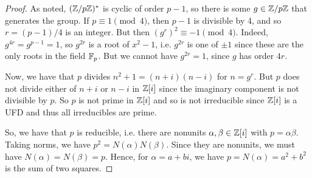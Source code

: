\begin{proof}
    As noted, $(\mathbb{Z}/p\mathbb{Z})^\ast$ is cyclic of order $p-1$, so there is some $g \in \mathbb{Z}/p\mathbb{Z}$ that generates the group. If $p \equiv 1 \pmod{4}$, then $p-1$ is divisible by 4, and so $r = (p-1)/4$ is an integer. But then $(g^r)^2 \equiv -1 \pmod{4}$. Indeed, $g^{4r} = g^{p-1} = 1$, so $g^{2r}$ is a root of $x^2-1$, i.e. $g^{2r}$ is one of $\pm 1$ since these are the only roots in the field $\mathbb{F}_p$. But we cannot have $g^{2r} = 1$, since $g$ has order $4r$.

    Now, we have that $p$ divides $n^2+1 = (n+i)(n-i)$ for $n = g^r$. But $p$ does not divide either of $n+i$ or $n-i$ in $\mathbb{Z}[i]$ since the imaginary component is not divisible by $p$. So $p$ is not prime in $\mathbb{Z}[i]$ and so is not irreducible since $\mathbb{Z}[i]$ is a UFD and thus all irreducibles are prime.

    So, we have that $p$ is reducible, i.e. there are nonunits $\alpha,\beta \in \mathbb{Z}[i]$ with $p = \alpha\beta$. Taking norms, we have $p^2 = N(\alpha)N(\beta)$. Since they are nonunits, we must have $N(\alpha) = N(\beta) = p$. Hence, for $\alpha = a+bi$, we have $p = N(\alpha) = a^2+b^2$ is the sum of two squares.
\end{proof}
